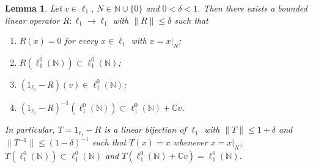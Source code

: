 \documentclass[12pt]{article}
\newtheorem{lemma}[theorem]{Lemma}
\newcommand{\lo}[1]{\ell_1^0(#1)}
\newcommand{\norm}[1]{\lVert #1\rVert}
\begin{document}
\begin{lemma}\label{OneVectorTheorem} Let $v\in\ell_1$,
    $N\in\mathbb{N}\cup\{0\}$ and $0<\delta<1$. Then there exists a bounded
    linear operator $R:\ell_1\to\ell_1$ with $\norm{R}\leq\delta$ such that
    \begin{enumerate}[label = (\roman*)]
        \item $R(x)=0$ for every $x\in\ell_1$ with $x=x|_N$;
        \item $R(\lo{\mathbb{N}})\subset\lo{\mathbb{N}}$;
        \item $(1_{\ell_1}-R)(v)\in\lo{\mathbb{N}}$;
        \item ${(1_{\ell_1}-R)}^{-1}(\lo{\mathbb{N}})\subset\lo{\mathbb{N}}+\mathbb{C}v$.
    \end{enumerate}
    In particular, $T=1_{\ell_1}-R$ is a linear bijection of $\ell_1$ with
    $\norm{T}\leq 1+\delta$ and $\norm{T^{-1}}\leq{(1-\delta)}^{-1}$ such
    that $T(x)=x$ whenever $x=x|_N$, $T(\lo{\mathbb{N}})\subset\lo{\mathbb{N}}$
    and $T(\lo{\mathbb{N}}+\mathbb{C}v)=\lo{\mathbb{N}}$.
\end{lemma}
\end{document}
